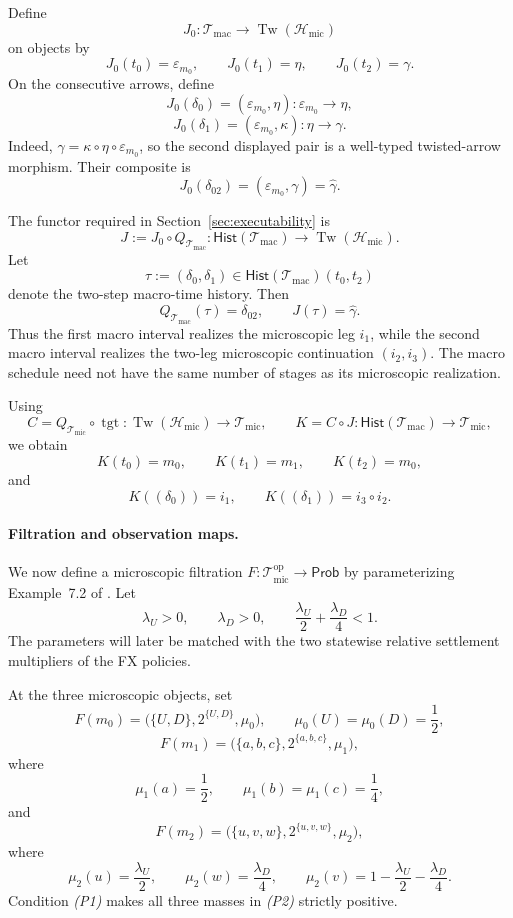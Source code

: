 \documentclass[11pt,a4paper]{article}
\newcommand{\Prob}{\mathsf{Prob}}
\newcommand{\Hist}{\mathsf{Hist}}
\newcommand{\Tw}{\operatorname{Tw}}
\newcommand{\Tmic}{\mathcal T_{\mathrm{mic}}}
\newcommand{\Tmac}{\mathcal T_{\mathrm{mac}}}
\newcommand{\Hmic}{\mathcal H_{\mathrm{mic}}}
\DeclareMathOperator{\tgt}{tgt}
\begin{document}
Define
\[
  J_0:\Tmac\longrightarrow\Tw(\Hmic)
\]
on objects by
\[
  J_0(t_0)=\varepsilon_{m_0},
  \qquad
  J_0(t_1)=\eta,
  \qquad
  J_0(t_2)=\gamma.
\]
On the consecutive arrows, define
\[
  J_0(\delta_0)
  =
  (\varepsilon_{m_0},\eta):
  \varepsilon_{m_0}\to\eta,
\]
\[
  J_0(\delta_1)
  =
  (\varepsilon_{m_0},\kappa):
  \eta\to\gamma.
\]
Indeed, $\gamma=\kappa\circ\eta\circ\varepsilon_{m_0}$, so the
second displayed pair is a well-typed twisted-arrow morphism. Their
composite is
\[
  J_0(\delta_{02})
  =
  (\varepsilon_{m_0},\gamma)
  =
  \widehat\gamma.
\]

The functor required in Section~\ref{sec:executability} is
\[
  J:=J_0\circ Q_{\Tmac}:
  \Hist(\Tmac)\longrightarrow\Tw(\Hmic).
\]
Let
\[
  \tau := (\delta_0,\delta_1)
  \in \Hist(\Tmac)(t_0,t_2)
\]
denote the two-step macro-time history. Then
\[
  Q_{\Tmac}(\tau)=\delta_{02},
  \qquad
  J(\tau)=\widehat\gamma.
\]
Thus the first macro interval realizes the microscopic leg $i_1$, while
the second macro interval realizes the two-leg microscopic continuation
$(i_2,i_3)$. The macro schedule need not have the same number of stages
as its microscopic realization.

Using
\[
  C=Q_{\Tmic}\circ\tgt:
  \Tw(\Hmic)\to\Tmic,
  \qquad
  K=C\circ J:
  \Hist(\Tmac)\to\Tmic,
\]
we obtain
\[
  K(t_0)=m_0,
  \qquad K(t_1)=m_1,
  \qquad K(t_2)=m_0,
\]
and
\[
  K((\delta_0))=i_1,
  \qquad
  K((\delta_1))=i_3\circ i_2.
\]

\paragraph{Filtration and observation maps.}
\label{sec:parameterized-non-flat-filtration}

We now define a microscopic filtration
$
  F:\Tmic^{\mathrm{op}}\to\Prob
$
by parameterizing Example~7.2 of \cite{AdachiHaraAB}.
Let
\[
  \lambda_U>0,
  \qquad
  \lambda_D>0,
  \qquad
  \frac{\lambda_U}{2}+\frac{\lambda_D}{4}<1.
  \tag{P1}
\]
The parameters will later be matched with the two statewise relative
settlement multipliers of the FX policies.

At the three microscopic objects, set
\[
  F(m_0)
  =
  \bigl(\{U,D\},2^{\{U,D\}},\mu_0\bigr),
  \qquad
  \mu_0(U)=\mu_0(D)=\frac12,
\]
\[
  F(m_1)
  =
  \bigl(\{a,b,c\},2^{\{a,b,c\}},\mu_1\bigr),
\]
where
\[
  \mu_1(a)=\frac12,
  \qquad
  \mu_1(b)=\mu_1(c)=\frac14,
\]
and
\[
  F(m_2)
  =
  \bigl(\{u,v,w\},2^{\{u,v,w\}},\mu_2\bigr),
\]
where
\[
  \mu_2(u)=\frac{\lambda_U}{2},
  \qquad
  \mu_2(w)=\frac{\lambda_D}{4},
  \qquad
  \mu_2(v)=1-\frac{\lambda_U}{2}-\frac{\lambda_D}{4}.
  \tag{P2}
\]
Condition \emph{(P1)} makes all three masses in \emph{(P2)} strictly
positive.
\end{document}
